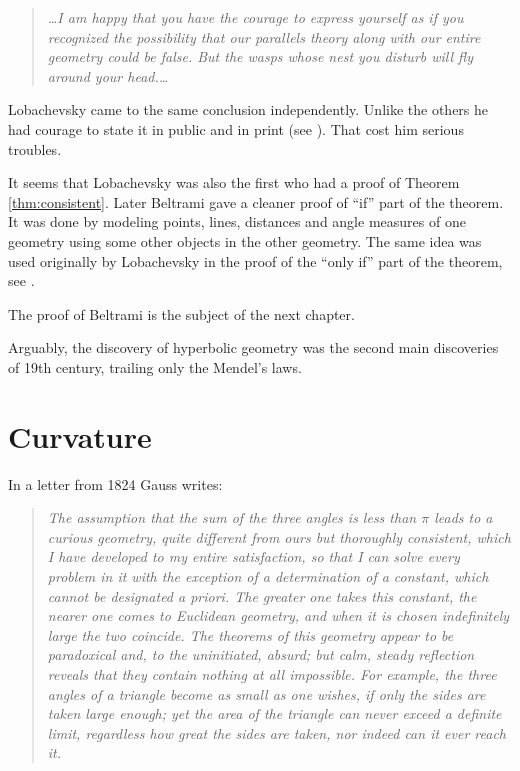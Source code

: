 \begin{quotation}{\it
\dots I am happy that you have the courage to express yourself as if you recognized the possibility
that our parallels theory along with our entire geometry could be false. But the wasps whose
nest you disturb will fly around your head.\dots}
\end{quotation}

Lobachevsky came to the same conclusion independently.
Unlike the others he had courage to state it in public and in print
(see \cite{lobachevsky}).
That cost him serious troubles.

It seems that Lobachevsky was also the first who had a proof of Theorem \ref{thm:consistent}.
Later Beltrami gave a cleaner proof of ``if'' part of the theorem.
It was done by modeling points, lines, distances and angle measures of one geometry using some other objects in the other geometry.
The same idea was used originally by Lobachevsky in the proof of the ``only if'' part of the theorem, see \cite[34]{lobachevsky-1840}.

The proof of Beltrami is the subject of the next chapter. 

\medskip

Arguably, the discovery of hyperbolic geometry was the second main discoveries of 19th century, 
trailing only the Mendel's laws.

\section*{Curvature}
In a letter from 1824 Gauss writes: 

\begin{quotation}{\it
The assumption that the sum of the three angles is less than $\pi$ leads to a curious geometry, 
quite different from ours but thoroughly consistent, 
which I have developed to my entire satisfaction, 
so that I can solve every problem in it with the exception of a determination of a constant, which cannot be designated a priori. 
The greater one takes this constant, the nearer one comes to Euclidean geometry, 
and when it is chosen indefinitely large the two coincide.
The theorems of this geometry appear to be paradoxical and, 
to the uninitiated, absurd; but calm, steady reflection reveals that they contain nothing at all impossible. 
For example, the three angles of a triangle become as small as one wishes, if only the sides are taken large enough; 
yet the area of the triangle can never exceed a definite limit, regardless how great the sides are taken, 
nor indeed can it ever reach it.}
\end{quotation} 

